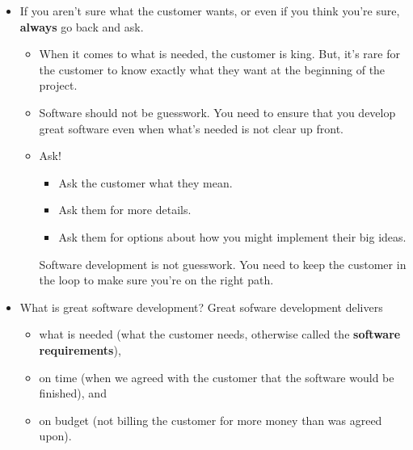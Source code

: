 \documentclass[letterpaper]{article}
\begin{document}
\begin{itemize}
    \item If you aren't sure what the customer wants, or even if you think you're sure, \textbf{always} go back and ask.
    \begin{itemize}
        \item When it comes to what is needed, the customer is king. But, it's rare for the customer to know exactly what they want at the beginning of the project. 
        \item Software should not be guesswork. You need to ensure that you develop great software even when what's needed is not clear up front. 
        \item Ask! 
        \begin{itemize}
            \item Ask the customer what they mean. 
            \item Ask them for more details. 
            \item Ask them for options about how you might implement their big ideas.
        \end{itemize}
        \begin{mdframed}
            Software development is not guesswork. You need to keep the customer in the loop to make sure you're on the right path. 
        \end{mdframed}
    \end{itemize}

    \item What is great software development? Great sofware development delivers  
    \begin{itemize}
        \item what is needed (what the customer needs, otherwise called the \textbf{software requirements}),
        \item on time (when we agreed with the customer that the software would be finished), and
        \item on budget (not billing the customer for more money than was agreed upon).
    \end{itemize}


\end{itemize}
\end{document}

